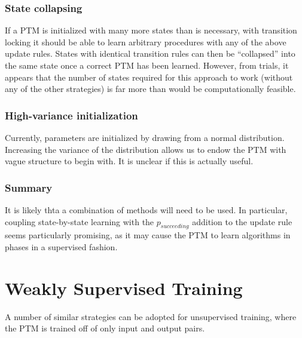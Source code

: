 \documentclass{article}
\begin{document}
\subsubsection{State collapsing}
If a PTM is initialized with many more states than is necessary, with transition locking it should be able to learn arbitrary procedures with any of the above update rules. States with identical transition rules can then be ``collapsed'' into the same state once a correct PTM has been learned. However, from trials, it appears that the number of states required for this approach to work (without any of the other strategies) is far more than would be computationally feasible. 

\subsubsection{High-variance initialization}
Currently, parameters are initialized by drawing from a normal distribution. Increasing the variance of the distribution allows us to endow the PTM with vague structure to begin with. It is unclear if this is actually useful. 

\subsubsection{Summary}
It is likely thta a combination of methods will need to be used. In particular, coupling state-by-state learning with the $p_{succeeding}$ addition to the update rule seems particularly promising, as it may cause the PTM to learn algorithms in phases in a supervised fashion.

\section{Weakly Supervised Training}

A number of similar strategies can be adopted for unsupervised training, where the PTM is trained off of only input and output pairs. 
\end{document}
